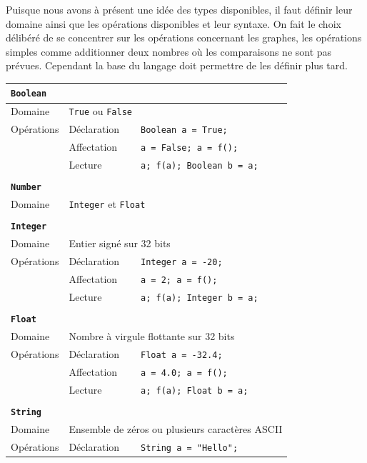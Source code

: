 \documentclass[french]{article}
\begin{document}
				Puisque nous avons à présent une idée des types disponibles, il faut définir leur domaine ainsi que les opérations disponibles et leur syntaxe. On fait le choix délibéré de se concentrer sur les opérations concernant les graphes, les opérations simples comme additionner deux nombres où les comparaisons ne sont pas prévues. Cependant la base du langage doit permettre de les définir plus tard. 
			
				\begin{longtable}{lll}
					\textbf{\texttt{Boolean}}\\ \hline \hline
					Domaine & \multicolumn{2}{l}{\texttt{True} ou \texttt{False}}\\ 
					Opérations & Déclaration & \texttt{Boolean a = True;}\\
					& Affectation & \texttt{a = False; a = f();}\\
					& Lecture & \texttt{a; f(a); Boolean b = a;}\\ 
					\\
					\textbf{\texttt{Number}}\\ \hline \hline
					Domaine & \multicolumn{2}{l}{\texttt{Integer} et \texttt{Float}}\\ 
					\\
					\textbf{\texttt{Integer}}\\ \hline \hline
					Domaine & \multicolumn{2}{l}{Entier signé sur 32 bits}\\
					Opérations & Déclaration & \texttt{Integer a = -20;}\\
					& Affectation & \texttt{a = 2; a = f();}\\
					& Lecture & \texttt{a; f(a); Integer b = a;}\\ 
					\\
					\textbf{\texttt{Float}}\\ \hline \hline
					Domaine & \multicolumn{2}{l}{Nombre à virgule flottante sur 32 bits}\\
					Opérations & Déclaration & \texttt{Float a = -32.4;}\\
					& Affectation & \texttt{a = 4.0; a = f();}\\
					& Lecture & \texttt{a; f(a); Float b = a;}\\ 
					\\
					\textbf{\texttt{String}}\\ \hline \hline
					Domaine & \multicolumn{2}{l}{Ensemble de zéros ou plusieurs caractères ASCII}\\
					Opérations & Déclaration & \texttt{String a = "Hello";}\\

\end{longtable}
\end{document}
